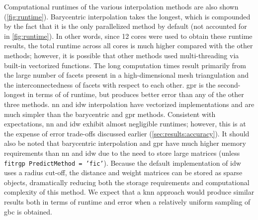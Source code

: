 \documentclass[preprint,12pt]{elsarticle}
\begin{document}
Computational runtimes of the various interpolation methods are also shown (\cref{fig:runtime}). Barycentric interpolation takes the longest, which is compounded by the fact that it is the only parallelized method by default (not accounted for in \cref{fig:runtime}). In other words, since 12 cores were used to obtain these runtime results, the total runtime across all cores is much higher compared with the other methods; however, it is possible that other methods used multi-threading via built-in vectorized functions. The long computation times result primarily from the large number of facets present in a high-dimensional mesh triangulation and the interconnectedness of facets with respect to each other. \Gls{gpr} is the second-longest in terms of of runtime, but produces better error than any of the other three methods. \Gls{nn} and \gls{idw} interpolation have vectorized implementations and are much simpler than the barycentric and \gls{gpr} methods. Consistent with expectations, \gls{nn} and \gls{idw} exhibit almost negligible runtimes; however, this is at the expense of error trade-offs discussed earlier (\cref{sec:results:accuracy}). It should also be noted that barycentric interpolation and \gls{gpr} have much higher memory requirements than \gls{nn} and \gls{idw} due to the need to store large matrices (unless \texttt{fitrgp PredictMethod = 'fic'}). Because the default implementation of \gls{idw} uses a radius cut-off, the distance and weight matrices can be stored as sparse objects, dramatically reducing both the storage requirements and computational complexity of this method. We expect that a \gls{knn} approach would produce similar results both in terms of runtime and error when a relatively uniform sampling of \gls{gbc} is obtained.
\end{document}
